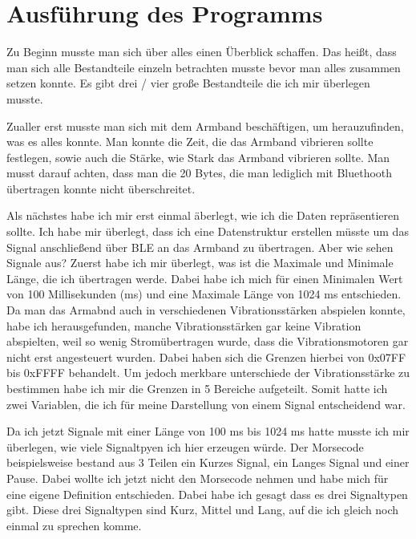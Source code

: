 
\section{Ausführung des Programms}
\label{ch:Entwurf:sec:Ausführung des Programms}

Zu Beginn musste man sich {\"u}ber alles einen {\"U}berblick schaffen. 
Das heißt, dass man sich alle Bestandteile einzeln betrachten musste bevor man alles zusammen setzen konnte. 
Es gibt drei / vier gro{\ss}e Bestandteile die ich mir {\"u}berlegen musste.

Zualler erst musste man sich mit dem Armband besch{\"a}ftigen, um herauzufinden, was es alles konnte. 
Man konnte die Zeit, die das Armband vibrieren sollte festlegen, sowie auch die St{\"a}rke, wie Stark das Armband vibrieren sollte. 
Man musst darauf achten, dass man die 20 Bytes, die man lediglich mit Bluethooth {\"u}bertragen konnte nicht {\"u}berschreitet.

Als n{\"a}chstes habe ich mir erst einmal {\"a}berlegt, wie ich die Daten repr{\"a}sentieren sollte. Ich habe mir {\"u}berlegt, dass ich eine Datenstruktur erstellen m{\"u}sste um das Signal anschlie{\ss}end {\"u}ber BLE an das Armband zu {\"u}bertragen. Aber wie sehen Signale aus? Zuerst habe ich mir {\"u}berlegt, was ist die Maximale und Minimale L{\"a}nge, die ich {\"u}bertragen werde. Dabei habe ich mich f{\"u}r einen Minimalen Wert von 100 Millisekunden (ms) und eine Maximale L{\"a}nge von 1024 ms entschieden. Da man das Armabnd auch in verschiedenen Vibrationsst{\"a}rken abspielen konnte, habe ich herausgefunden, manche Vibrationsst{\"a}rken gar keine Vibration abspielten, weil so wenig Strom{\"u}bertragen wurde, dass die Vibrationsmotoren gar nicht erst angesteuert wurden. Dabei haben sich die Grenzen hierbei von 0x07FF bis 0xFFFF behandelt. Um jedoch merkbare unterschiede der Vibrationsst{\"a}rke zu bestimmen habe ich mir die Grenzen in 5 Bereiche aufgeteilt. 
Somit hatte ich zwei Variablen, die ich f{\"u}r meine Darstellung von einem Signal entscheidend war. 

Da ich jetzt Signale mit einer L{\"a}nge von 100 ms bis 1024 ms hatte musste ich mir {\"u}berlegen, wie viele Signaltpyen ich hier erzeugen w{\"u}rde. Der Morsecode beispielsweise bestand aus 3 Teilen ein Kurzes Signal, ein Langes Signal und einer Pause. Dabei wollte ich jetzt nicht den Morsecode nehmen und habe mich f{\"u}r eine eigene Definition entschieden. Dabei habe ich gesagt dass es drei Signaltypen gibt. Diese drei Signaltypen sind Kurz, Mittel und Lang, auf die ich gleich noch einmal zu sprechen komme.


